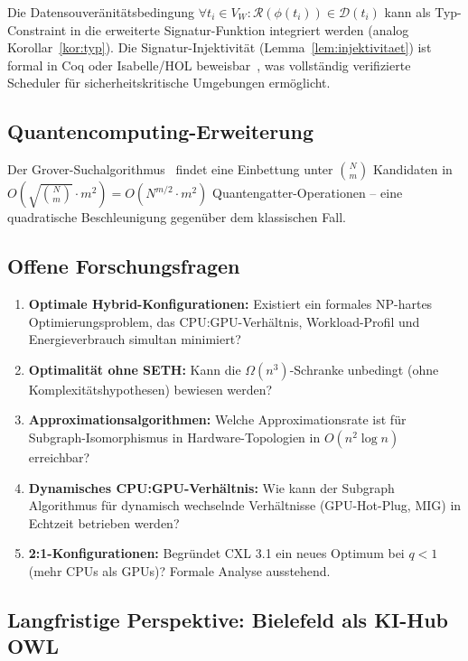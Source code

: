 ﻿\documentclass[a4paper,12pt]{article}
\theoremstyle{definition}
\begin{document}
Die Datensouver\"{a}nit\"{a}tsbedingung $\forall t_i \in V_W: \mathcal{R}(\phi(t_i)) \in \mathcal{D}(t_i)$ kann als Typ-Constraint in die erweiterte Signatur-Funktion integriert werden (analog Korollar~\ref{kor:typ}).
Die Signatur-Injektivit\"{a}t (Lemma~\ref{lem:injektivitaet}) ist formal in Coq oder Isabelle/HOL beweisbar~\cite{bertot2004interactive}, was vollst\"{a}ndig verifizierte Scheduler f\"{u}r sicherheitskritische Umgebungen erm\"{o}glicht.

\subsection{Quantencomputing-Erweiterung}

Der Grover-Suchalgorithmus~\cite{grover1996fast} findet eine Einbettung unter $\binom{N}{m}$ Kandidaten in
$O\!\left(\sqrt{\binom{N}{m}} \cdot m^2\right) = O\!\left(N^{m/2} \cdot m^2\right)$
Quantengatter-Operationen -- eine quadratische Beschleunigung gegen\"{u}ber dem klassischen Fall.

\subsection{Offene Forschungsfragen}

\begin{enumerate}
  \item \textbf{Optimale Hybrid-Konfigurationen:} Existiert ein formales NP-hartes Optimierungsproblem, das CPU:GPU-Verh\"{a}ltnis, Workload-Profil und Energieverbrauch simultan minimiert?
  \item \textbf{Optimalit\"{a}t ohne SETH:} Kann die $\Omega(n^3)$-Schranke unbedingt (ohne Komplexit\"{a}tshypothesen) bewiesen werden?
  \item \textbf{Approximationsalgorithmen:} Welche Approximationsrate ist f\"{u}r Subgraph-Isomorphismus in Hardware-Topologien in $O(n^2 \log n)$ erreichbar?
  \item \textbf{Dynamisches CPU:GPU-Verh\"{a}ltnis:} Wie kann der Subgraph Algorithmus f\"{u}r dynamisch wechselnde Verh\"{a}ltnisse (GPU-Hot-Plug, MIG) in Echtzeit betrieben werden?
  \item \textbf{2:1-Konfigurationen:} Begr\"{u}ndet CXL 3.1 ein neues Optimum bei $q < 1$ (mehr CPUs als GPUs)? Formale Analyse ausstehend.
\end{enumerate}

\subsection{Langfristige Perspektive: Bielefeld als KI-Hub OWL}
\end{document}
